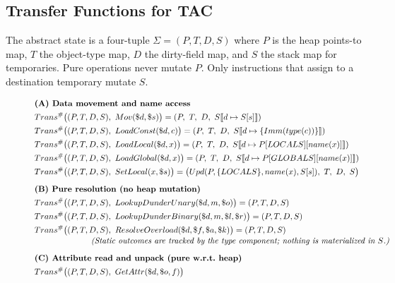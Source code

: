 \subsection{Transfer Functions for TAC}
\label{subsec:transfers}

The abstract state is a four-tuple \(\Sigma=(P,T,D,S)\) where \(P\) is the heap
points-to map, \(T\) the object-type map, \(D\) the dirty-field map, and \(S\)
the stack map for temporaries.  Pure operations never mutate \(P\).  Only
instructions that assign to a destination temporary mutate \(S\).

\begin{figure*}[t]
\centering
\begin{align*}
&\textbf{(A) Data movement and name access}\\
&Trans^\#\big((P,T,D,S),\ Mov(\$d,\$s)\big)
  = (P,\ T,\ D,\ S\llbracket d \mapsto S[s]\rrbracket)
\\
&Trans^\#\big((P,T,D,S),\ LoadConst(\$d,c)\big)
  = (P,\ T,\ D,\ S\llbracket d \mapsto \{Imm(type(c))\}\rrbracket)
\\
&Trans^\#\big((P,T,D,S),\ LoadLocal(\$d,x)\big)
  = (P,\ T,\ D,\ S\llbracket d \mapsto P[LOCALS][name(x)]\rrbracket)
\\
&Trans^\#\big((P,T,D,S),\ LoadGlobal(\$d,x)\big)
  = (P,\ T,\ D,\ S\llbracket d \mapsto P[GLOBALS][name(x)]\rrbracket)
\\
&Trans^\#\big((P,T,D,S),\ SetLocal(x,\$s)\big)
  = \big(Upd(P,\{LOCALS\},name(x),S[s]),\ T,\ D,\ S\big)
\\[0.6em]
&\textbf{(B) Pure resolution (no heap mutation)}\\
&Trans^\#\big((P,T,D,S),\ LookupDunderUnary(\$d,m,\$o)\big)=(P,T,D,S)
\\
&Trans^\#\big((P,T,D,S),\ LookupDunderBinary(\$d,m,\$l,\$r)\big)=(P,T,D,S)
\\
&Trans^\#\big((P,T,D,S),\ ResolveOverload(\$d,\$f,\$a,\$k)\big)=(P,T,D,S)
\\[-0.2em]
&\hspace{2.4cm}\text{\emph{(Static outcomes are tracked by the type component; nothing is materialized in \(S\).)}}
\\[0.6em]
&\textbf{(C) Attribute read and unpack (pure w.r.t.\ heap)}\\
&Trans^\#\big((P,T,D,S),\ GetAttr(\$d,\$o,f)\big)

\end{align*}
\end{figure*}
